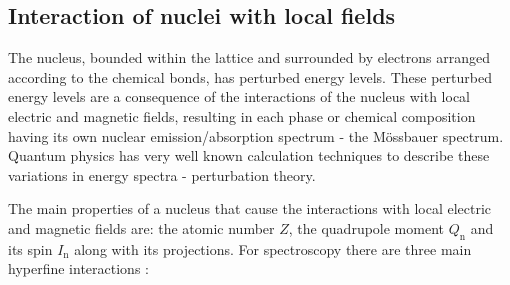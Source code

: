 
\subsection{Interaction of nuclei with local fields}
The nucleus, bounded within the lattice and surrounded by electrons arranged according to the chemical bonds, has perturbed energy levels. These perturbed energy levels are a consequence of the interactions of the nucleus with local electric and magnetic fields, resulting in each phase or chemical composition having its own nuclear emission/absorption spectrum - the Mössbauer spectrum. Quantum physics has very well known calculation techniques to describe these variations in energy spectra - perturbation theory.

\par
The main properties of a nucleus that cause the interactions with local electric and magnetic fields are: the atomic number $Z$, the quadrupole moment $Q_{\textrm{n}}$ and its spin $I_{\textrm{n}}$ along with its projections. For spectroscopy there are three main hyperfine interactions \cite{moss}:

